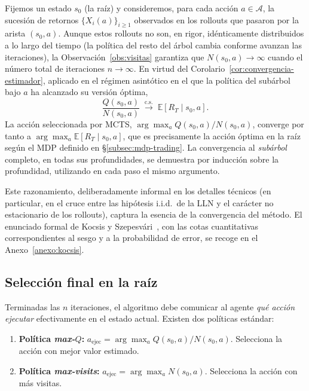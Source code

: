 Fijemos un estado $s_0$ (la raíz) y consideremos, para cada acción $a \in \mathcal{A}$, la sucesión de retornos $\{X_i(a)\}_{i \geq 1}$ observados en los rollouts que pasaron por la arista $(s_0, a)$. Aunque estos rollouts no son, en rigor, idénticamente distribuidos a lo largo del tiempo (la política del resto del árbol cambia conforme avanzan las iteraciones), la Observación~\ref{obs:visitas} garantiza que $N(s_0, a) \to \infty$ cuando el número total de iteraciones $n \to \infty$. En virtud del Corolario~\ref{cor:convergencia-estimador}, aplicado en el régimen asintótico en el que la política del subárbol bajo $a$ ha alcanzado su versión óptima,
\[
    \frac{Q(s_0, a)}{N(s_0, a)} \;\xrightarrow{\text{c.s.}}\; \mathbb{E}[R_T \mid s_0, a].
\]
La acción seleccionada por MCTS, $\arg\max_a Q(s_0,a)/N(s_0,a)$, converge por tanto a $\arg\max_a \mathbb{E}[R_T \mid s_0, a]$, que es precisamente la acción óptima en la raíz según el MDP definido en §\ref{subsec:mdp-trading}. La convergencia al \emph{subárbol} completo, en todas sus profundidades, se demuestra por inducción sobre la profundidad, utilizando en cada paso el mismo argumento.

Este razonamiento, deliberadamente informal en los detalles técnicos (en particular, en el cruce entre las hipótesis i.i.d.\ de la LLN y el carácter no estacionario de los rollouts), captura la esencia de la convergencia del método. El enunciado formal de Kocsis y Szepesvári~\cite{kocsis2006}, con las cotas cuantitativas correspondientes al sesgo y a la probabilidad de error, se recoge en el Anexo~\ref{anexo:kocsis}.

\subsection{Selección final en la raíz}
\label{subsec:seleccion-final}

Terminadas las $n$ iteraciones, el algoritmo debe comunicar al agente \emph{qué acción ejecutar} efectivamente en el estado actual. Existen dos políticas estándar:

\begin{enumerate}
    \item \textbf{Política \emph{max-$Q$}:} $a_{\text{ejec}} = \arg\max_a Q(s_0,a) / N(s_0,a)$. Selecciona la acción con mejor valor estimado.
    \item \textbf{Política \emph{max-visits}:} $a_{\text{ejec}} = \arg\max_a N(s_0,a)$. Selecciona la acción con más visitas.
\end{enumerate}

